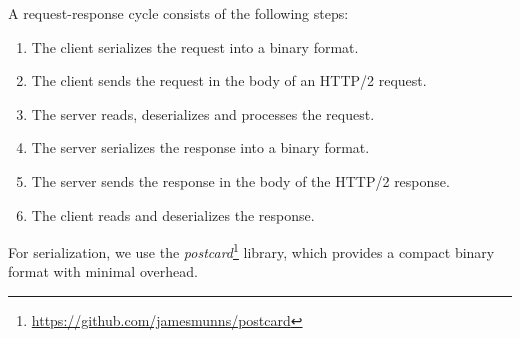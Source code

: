 A request-response cycle consists of the following steps:
\begin{enumerate}
    \item The client serializes the request into a binary format.
    \item The client sends the request in the body of an HTTP/2 request.
    \item The server reads, deserializes and processes the request.
    \item The server serializes the response into a binary format.
    \item The server sends the response in the body of the HTTP/2 response.
    \item The client reads and deserializes the response.
\end{enumerate}

For serialization, we use the
\emph{postcard}\footnote{\url{https://github.com/jamesmunns/postcard}} library,
which provides a compact binary format with minimal overhead.
